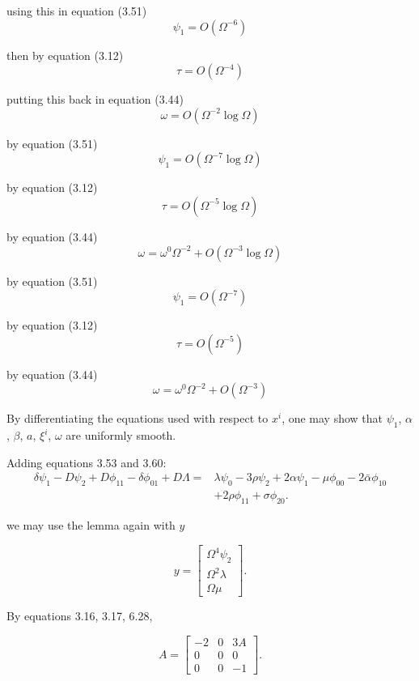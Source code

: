 using this in equation (3.51)
\[
\psi_1 = O(\Omega^{-6})
\]

then by equation (3.12)
\[
\tau = O(\Omega^{-4})
\]

putting this back in equation (3.44)
\[
\omega = O(\Omega^{-2}\log\Omega)
\]

by equation (3.51)
\[
\psi_1 = O(\Omega^{-7}\log\Omega)
\]

by equation (3.12)
\[
\tau = O(\Omega^{-5}\log\Omega)
\]

by equation (3.44)
\[
\omega
=
\omega^{0}\Omega^{-2}
+
O(\Omega^{-3}\log\Omega)
\]

by equation (3.51)
\begin{equation}
\psi_1 = O(\Omega^{-7})
\tag{6.25}
\end{equation}

by equation (3.12)
\begin{equation}
\tau = O(\Omega^{-5})
\tag{6.26}
\end{equation}

by equation (3.44)
\begin{equation}
\omega
=
\omega^{0}\Omega^{-2}
+
O(\Omega^{-3})
\tag{6.27}
\end{equation}

By differentiating the equations used with respect to $x^i$,
one may show that $\psi_1$, $\alpha$, $\beta$, $a$, $\xi^i$, $\omega$
are uniformly smooth.

Adding equations 3.53 and 3.60:
\begin{equation}
\begin{aligned}
\delta\psi_1
- D\psi_2
+ D\phi_{11}
- \delta\phi_{01}
+ D\Lambda
={}&
\lambda\psi_0
-3\rho\psi_2
+2\alpha\psi_1
-\mu\phi_{00}
-2\bar{\alpha}\phi_{10}
\\
&+2\rho\phi_{11}
+\sigma\phi_{20}.
\end{aligned}
\tag{6.28}
\end{equation}


we may use the lemma again with $y$

\[
y =
\begin{bmatrix}
\Omega^4 \psi_2 \\
\Omega^2 \lambda \\
\Omega \mu
\end{bmatrix}.
\]

By equations 3.16, 3.17, 6.28,

\[
A =
\begin{bmatrix}
-2 & 0 & 3A \\
0  & 0 & 0  \\
0  & 0 & -1
\end{bmatrix}.
\]

